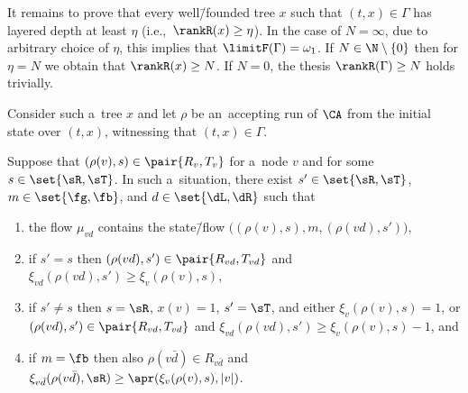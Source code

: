 It remains to prove that every well\=/founded tree $x$ such that $(t,x)\in\Gamma$ has layered depth at least $\eta$ (i.e.,~$\rankR(x)\geq \eta$).
In the case of $N=\infty$, due to arbitrary choice of $\eta$, this implies that $\limitF(\Gamma)=\omega_1$.
If $N\in\N\setminus\{0\}$ then for $\eta=N$ we obtain that $\rankR(x)\geq N$.
If $N=0$, the thesis $\rankR(\Gamma)\geq N$ holds trivially.

Consider such a~tree $x$ and let $\rho$ be an~accepting run of $\CA$ from the initial state over $(t,x)$, witnessing that $(t,x)\in\Gamma$.

\begin{clm}\label{claim:go-down}
	Suppose that $(\rho(v),s)\in\pair{R_v,T_v}$ for a~node $v$ and for some $s\in\set{\sR,\sT}$.
	In such a~situation, there exist $s'\in\set{\sR,\sT}$, $m\in\set{\fg,\fb}$, and $d\in\set{\dL,\dR}$ such that
	\begin{enumerate}
	\item	the flow $\mu_{vd}$ contains the state\=/flow $\big((\rho(v),s),m,(\rho(vd),s')\big)$,
		\label{it:down-flow}
	\item	if $s' = s$ then $(\rho(vd),s')\in\pair{R_{vd},T_{vd}}$ and $\xi_{vd}(\rho(vd),s')\geq\xi_v(\rho(v),s)$,
		\label{it:down-eq}
	\item	if $s'\neq s$ then $s=\sR$, $x(v)=1$, $s'=\sT$, and either $\xi_v(\rho(v),s)=1$, or $(\rho(vd),s')\in\pair{R_{vd},T_{vd}}$ and $\xi_{vd}(\rho(vd),s')\geq\xi_v(\rho(v),s)-1$, and
		\label{it:down-neq}
	\item	if $m=\fb$ then also $\rho(v\bar{d})\in R_{v\bar{d}}$ and $\xi_{v\bar{d}}(\rho(v\bar{d}),\sR)\geq\apr(\xi_v(\rho(v),s),|v|)$.
		\label{it:down-two}
	\end{enumerate}
\end{clm}

